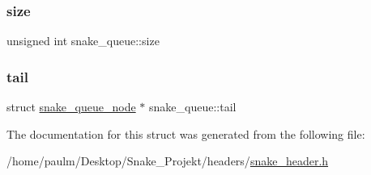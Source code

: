 \subsubsection{\texorpdfstring{size}{size}}
{\footnotesize\ttfamily unsigned int snake\+\_\+queue\+::size}

\mbox{\label{structsnake__queue_a7d432980209f748e5d916d1fb609dceb}} 
\subsubsection{\texorpdfstring{tail}{tail}}
{\footnotesize\ttfamily struct \mbox{\hyperlink{structsnake__queue__node}{snake\+\_\+queue\+\_\+node}} $\ast$ snake\+\_\+queue\+::tail}



The documentation for this struct was generated from the following file\+:\begin{DoxyCompactItemize}
\item 
/home/paulm/\+Desktop/\+Snake\+\_\+\+Projekt/headers/\mbox{\hyperlink{snake__header_8h}{snake\+\_\+header.\+h}}\end{DoxyCompactItemize}
